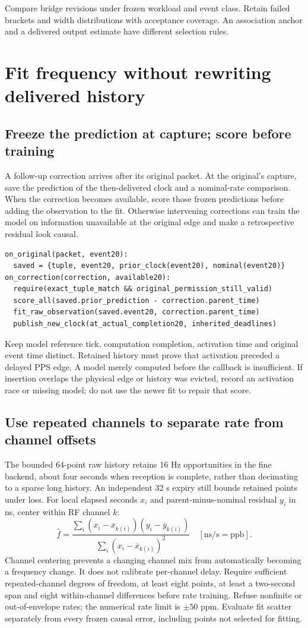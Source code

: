 \documentclass[10pt,letterpaper]{article}
\begin{document}
Compare bridge revisions under frozen workload and event class. Retain failed brackets and width distributions with acceptance coverage. An association anchor and a delivered output estimate have different selection rules.
\newpage
\section{Fit frequency without rewriting delivered history}
\subsection{Freeze the prediction at capture; score before training}
A follow-up correction arrives after its original packet. At the original's capture, save the prediction of the then-delivered clock and a nominal-rate comparison. When the correction becomes available, score those frozen predictions before adding the observation to the fit. Otherwise intervening corrections can train the model on information unavailable at the original edge and make a retrospective residual look causal.

\begin{lstlisting}
on_original(packet, event20):
  saved = {tuple, event20, prior_clock(event20), nominal(event20)}
on_correction(correction, available20):
  require(exact_tuple_match && original_permission_still_valid)
  score_all(saved.prior_prediction - correction.parent_time)
  fit_raw_observation(saved.event20, correction.parent_time)
  publish_new_clock(at_actual_completion20, inherited_deadlines)
\end{lstlisting}

Keep model reference tick, computation completion, activation time and original event time distinct. Retained history must prove that activation preceded a delayed PPS edge. A model merely computed before the callback is insufficient. If insertion overlaps the physical edge or history was evicted, record an activation race or missing model; do not use the newer fit to repair that score.

\subsection{Use repeated channels to separate rate from channel offsets}
The bounded 64-point raw history retains 16 Hz opportunities in the fine backend, about four seconds when reception is complete, rather than decimating to a sparse long history. An independent 32 s expiry still bounds retained points under loss. For local elapsed seconds $x_i$ and parent-minus-nominal residual $y_i$ in ns, center within RF channel $k$:
\[
 \widehat f=\frac{\sum_i(x_i-\overline x_{k(i)})(y_i-\overline y_{k(i)})}
 {\sum_i(x_i-\overline x_{k(i)})^2}\quad[\mathrm{ns/s}=\mathrm{ppb}].
\]
Channel centering prevents a changing channel mix from automatically becoming a frequency change. It does not calibrate per-channel delay. Require sufficient repeated-channel degrees of freedom, at least eight points, at least a two-second span and eight within-channel differences before rate training. Refuse nonfinite or out-of-envelope rates; the numerical rate limit is $\pm50$ ppm. Evaluate fit scatter separately from every frozen causal error, including points not selected for fitting.
\end{document}
